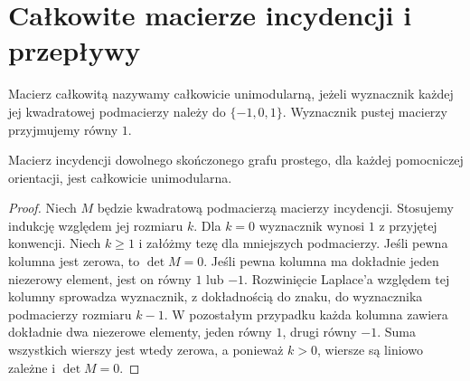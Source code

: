\section{Całkowite macierze incydencji i przepływy}
\label{sec:tg-incidence-integral}

\begin{definicja}
Macierz całkowitą nazywamy całkowicie unimodularną, jeżeli
wyznacznik każdej jej kwadratowej podmacierzy należy do
$\{-1,0,1\}$. Wyznacznik pustej macierzy przyjmujemy równy $1$.
\end{definicja}

\begin{twierdzenie}
\label{thm:tg-incidence-tu}
Macierz incydencji dowolnego skończonego grafu prostego,
dla każdej pomocniczej orientacji, jest całkowicie unimodularna.
\end{twierdzenie}
\begin{proof}
Niech $M$ będzie kwadratową podmacierzą macierzy incydencji.
Stosujemy indukcję względem jej rozmiaru $k$.
Dla $k=0$ wyznacznik wynosi $1$ z przyjętej konwencji.
Niech $k\geq1$ i załóżmy tezę dla mniejszych podmacierzy.
Jeśli pewna kolumna jest zerowa, to $\det M=0$.
Jeśli pewna kolumna ma dokładnie jeden niezerowy element,
jest on równy $1$ lub $-1$. Rozwinięcie Laplace'a względem
tej kolumny sprowadza wyznacznik, z dokładnością do znaku,
do wyznacznika podmacierzy rozmiaru $k-1$.
W pozostałym przypadku każda kolumna zawiera dokładnie dwa
niezerowe elementy, jeden równy $1$, drugi równy $-1$.
Suma wszystkich wierszy jest wtedy zerowa, a ponieważ $k>0$,
wiersze są liniowo zależne i $\det M=0$.
\end{proof}


